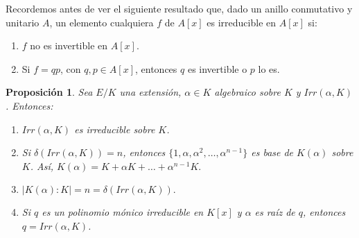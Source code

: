\documentclass[12pt]{article}
\newtheorem{proposition}[theorem]{Proposición}
\begin{document}
Recordemos antes de ver el siguiente resultado que, dado un anillo conmutativo y unitario $A$, un elemento cualquiera $f$ de $A[x]$ es irreducible en $A[x]$ si: \begin{enumerate}
\item $f$ no es invertible en $A[x]$.
\item Si $f = qp$, con $q,p \in A[x]$, entonces $q$ es invertible o $p$ lo es.
\end{enumerate}

\begin{proposition} Sea $E/K$ una extensión, $\alpha \in K$ algebraico sobre $K$ y $Irr(\alpha, K)$. Entonces: \begin{enumerate}
\item $Irr(\alpha, K)$ es irreducible sobre $K$.
\item Si $\delta(Irr(\alpha, K)) = n$, entonces $\lbrace 1, \alpha, \alpha^{2}, \ldots, \alpha^{n-1} \rbrace$ es base de $K(\alpha)$ sobre $K$. Así, $K(\alpha) = K + \alpha K + \ldots + \alpha^{n-1} K.$
\item $|K(\alpha) : K| = n = \delta (Irr(\alpha, K)).$
\item Si $q$ es un polinomio mónico irreducible en $K[x]$ y $\alpha$ es raíz de $q$, entonces $q = Irr(\alpha, K)$.
\end{enumerate}
\end{proposition}
\end{document}
